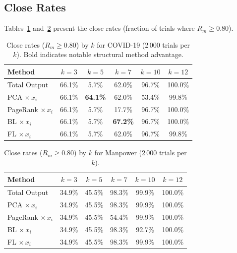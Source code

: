\subsection{Close Rates}

Tables~\ref{tab:covid-close-by-k} and~\ref{tab:manpower-close-by-k} present the close rates (fraction of trials where $R_m \geq 0.80$).

\begin{table}[H]
\centering
\begin{tabular}{@{}lccccc@{}}
\toprule
\textbf{Method} & $k{=}3$ & $k{=}5$ & $k{=}7$ & $k{=}10$ & $k{=}12$ \\
\midrule
Total Output         & 66.1\% &  5.7\% & 62.0\% & 96.7\% & 100.0\% \\
PCA $\times\, x_i$      & 66.1\% & \textbf{64.1\%} & 62.0\% & 53.4\% &  99.8\% \\
PageRank $\times\, x_i$ & 66.1\% &  5.7\% & 17.7\% & 96.7\% & 100.0\% \\
BL $\times\, x_i$       & 66.1\% &  5.7\% & \textbf{67.2\%} & 96.7\% & 100.0\% \\
FL $\times\, x_i$       & 66.1\% &  5.7\% & 62.0\% & 96.7\% &  99.8\% \\
\bottomrule
\end{tabular}
\caption{Close rates ($R_m \geq 0.80$) by $k$ for COVID-19 (2\,000 trials per $k$). Bold indicates notable structural method advantage.}
\label{tab:covid-close-by-k}
\end{table}

\begin{table}[H]
\centering
\begin{tabular}{@{}lccccc@{}}
\toprule
\textbf{Method} & $k{=}3$ & $k{=}5$ & $k{=}7$ & $k{=}10$ & $k{=}12$ \\
\midrule
Total Output         & 34.9\% & 45.5\% & 98.3\% & 99.9\% & 100.0\% \\
PCA $\times\, x_i$      & 34.9\% & 45.5\% & 98.3\% & 99.9\% & 100.0\% \\
PageRank $\times\, x_i$ & 34.9\% & 45.5\% & 54.4\% & 99.9\% & 100.0\% \\
BL $\times\, x_i$       & 34.9\% & 45.5\% & 98.3\% & 92.7\% & 100.0\% \\
FL $\times\, x_i$       & 34.9\% & 45.5\% & 98.3\% & 99.9\% & 100.0\% \\
\bottomrule
\end{tabular}
\caption{Close rates ($R_m \geq 0.80$) by $k$ for Manpower (2\,000 trials per $k$).}
\label{tab:manpower-close-by-k}
\end{table}


